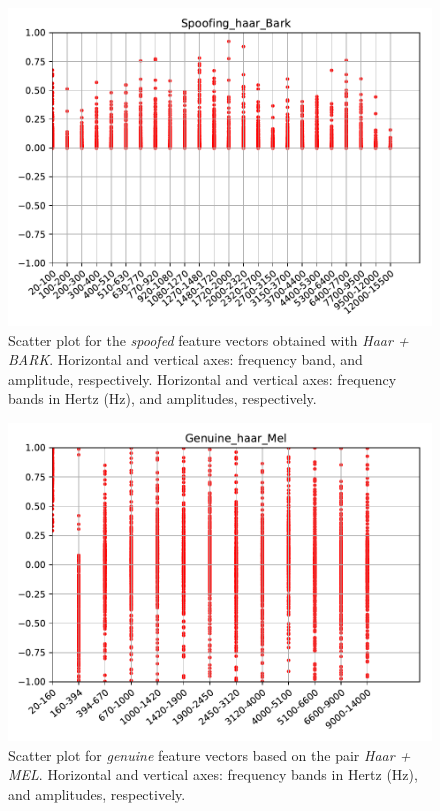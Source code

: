 		\begin{figure}[H]
			\centering
			\includegraphics[scale=.7]{images/results/barkVersusMel/Spoofing_haar_Bark.pdf}
			\caption{Scatter plot for the \textit{spoofed} feature vectors obtained with \textit{Haar + BARK}. Horizontal and vertical axes: frequency band, and amplitude, respectively. Horizontal and vertical axes: frequency bands in Hertz (Hz), and amplitudes, respectively.}
			\label{fig:spoofinghaarbark}
		\end{figure}
		\begin{figure}[H]
			\centering
			\includegraphics[scale=.7]{images/results/barkVersusMel/Genuine_haar_Mel.pdf}
			\caption{Scatter plot for \textit{genuine} feature vectors based on the pair \textit{Haar + MEL}. Horizontal and vertical axes: frequency bands in Hertz (Hz), and amplitudes, respectively.}
			\label{fig:livehaarmel}
		\end{figure}
